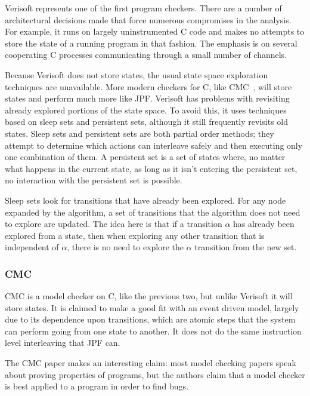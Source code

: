 \documentclass{article}
\begin{document}
\begin{multicols}{2}
Verisoft represents one of the first program checkers.  There are a
number of architectural decisions made that force numerous compromises
in the analysis.  For example, it runs on largely uninstrumented C
code and makes no attempts to store the state of a running program in
that fashion.  The emphasis is on several cooperating C processes
communicating through a small number of channels.

Because Verisoft does not store states, the usual state space
exploration techniques are unavailable.  More modern checkers for C,
like CMC~\cite{musuvathi:osdi:cmc}, will store states and perform much
more like JPF.  Verisoft has problems with revisiting already explored
portions of the state space.  To avoid this, it uses techniques based
on sleep sets and persistent sets, although it still frequently
revisits old states.  Sleep sets and persistent sets are both partial
order methods; they attempt to determine which actions can interleave
safely and then executing only one combination of them.  A persistent
set is a set of states where, no matter what happens in the current
state, as long as it isn't entering the persistent set, no interaction
with the persistent set is possible.

Sleep sets look for transitions that have already been explored.  For
any node expanded by the algorithm, a set of transitions that the
algorithm does not need to explore are updated.  The idea here is that
if a transition $\alpha$ has already been explored from a state, then
when exploring any other transition that is independent of $\alpha$,
there is no need to explore the $\alpha$ transition from the new set.

\subsubsection{CMC~\cite{musuvathi:osdi:cmc}}

CMC is a model checker on C, like the previous two, but unlike
Verisoft it will store states.  It is claimed to make a good fit with
an event driven model, largely due to its dependence upon transitions,
which are atomic steps that the system can perform going from one
state to another.  It does not do the same instruction level
interleaving that JPF can.

The CMC paper makes an interesting claim: most model checking papers
speak about proving properties of programs, but the authors claim that
a model checker is best applied to a program in order to find bugs.


\end{multicols}
\end{document}
